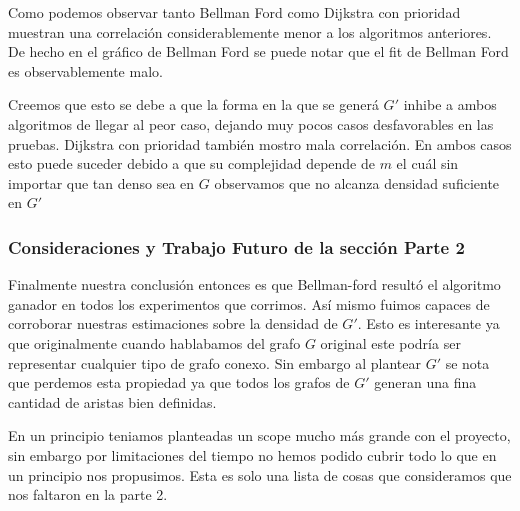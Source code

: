 \documentclass[12pt]{article}
\begin{document}
Como podemos observar tanto Bellman Ford como Dijkstra con prioridad muestran una correlación considerablemente menor a los algoritmos anteriores. De hecho en el gráfico de Bellman Ford se puede notar que el fit de Bellman Ford es observablemente malo.

Creemos que esto se debe a que la forma en la que se generá $G'$ inhibe a ambos algoritmos de llegar al peor caso, dejando muy pocos casos desfavorables en las pruebas. Dijkstra con prioridad también mostro mala correlación. En ambos casos esto puede suceder debido a que su complejidad depende de $m$ el cuál sin importar que tan denso sea en $G$ observamos que no alcanza densidad suficiente en $G'$

 
\subsubsection{Consideraciones y Trabajo Futuro de la sección Parte 2}

Finalmente nuestra conclusión entonces es que Bellman-ford resultó el algoritmo ganador en todos los experimentos que corrimos. Así mismo fuimos capaces de corroborar nuestras estimaciones sobre la densidad de $G'$. Esto es interesante ya que originalmente cuando hablabamos del grafo $G$ original este podría ser representar cualquier tipo de grafo conexo. Sin embargo al plantear $G'$ se nota que perdemos esta propiedad ya que todos los grafos de $G'$ generan una fina cantidad de aristas bien definidas.

En un principio teniamos planteadas un scope mucho más grande con el proyecto, sin embargo por limitaciones del tiempo no hemos podido cubrir todo lo que en un principio nos propusimos. Esta es solo una lista de cosas que consideramos que nos faltaron en la parte 2.
\end{document}
